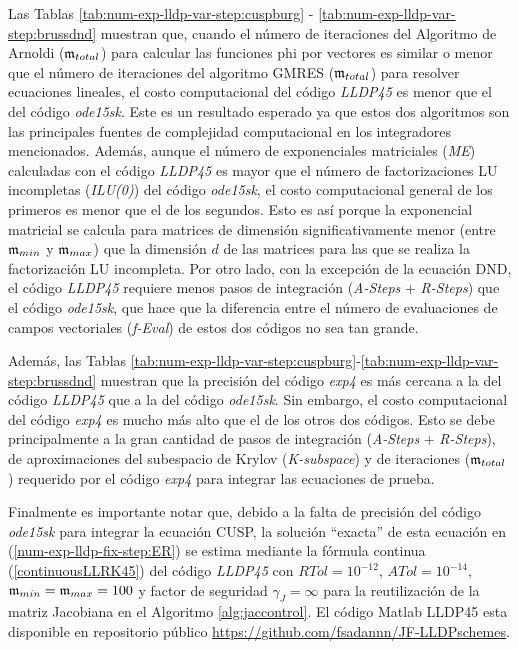 \vspace{0.5cm}

Las Tablas \ref{tab:num-exp-lldp-var-step:cuspburg} - \ref{tab:num-exp-lldp-var-step:brussdnd} muestran que, cuando el número de iteraciones del Algoritmo de Arnoldi ($\mathfrak{m}_{total}$) para calcular las funciones phi por vectores es similar o menor que el número de iteraciones del algoritmo GMRES ($\mathfrak{m}_{total}$) para resolver ecuaciones lineales, el costo computacional del código \emph{LLDP45} es menor que el del código \emph{ode15sk}. Este es un resultado esperado ya que estos dos algoritmos son las principales fuentes de complejidad computacional en los integradores mencionados. Además, aunque el número de exponenciales matriciales (\textit{ME}) calculadas con el código \emph{LLDP45} es mayor que el número de factorizaciones LU incompletas (\textit{ILU(0)}) del código \emph{ode15sk}, el costo computacional general de los primeros es menor que el de los segundos. Esto es así porque la exponencial matricial se calcula para matrices de dimensión significativamente menor (entre $\mathfrak{m}_{min}$ y $\mathfrak{m}_{max}$) que la dimensión $d$ de las matrices para las que se realiza la factorización LU incompleta. Por otro lado, con la excepción de la ecuación DND, el código \emph{LLDP45} requiere menos pasos de integración (\textit{A-Steps} + \textit{R-Steps}) que el código \emph{ode15sk}, que hace que la diferencia entre el número de evaluaciones de campos vectoriales (\textit{f-Eval}) de estos dos códigos no sea tan grande.

Además, las Tablas \ref{tab:num-exp-lldp-var-step:cuspburg}-\ref{tab:num-exp-lldp-var-step:brussdnd} muestran que la precisión del código \emph{exp4} es más cercana a la del código \emph{LLDP45} que a la del código \emph{ode15sk}. Sin embargo, el costo computacional del código \emph{exp4} es mucho más alto que el de los otros dos códigos. Esto se debe principalmente a la gran cantidad de pasos de integración (\textit{A-Steps} + \textit{R-Steps}), de aproximaciones del subespacio de Krylov (\textit{K-subspace}) y de iteraciones ($\mathfrak{m}_ {total}$) requerido por el código \emph{exp4} para integrar las ecuaciones de prueba.

Finalmente es importante notar que, debido a la falta de precisión del código \emph{ode15sk} para integrar la ecuación CUSP, la solución ``exacta'' de esta ecuación en (\ref{num-exp-lldp-fix-step:ER}) se estima mediante la fórmula continua (\ref{continuousLLRK45}) del código \emph{LLDP45} con $RTol = 10^{-12}$, $ATol = 10^{-14}$, $\mathfrak{m}_{min} = \mathfrak{m}_{max} = 100$ y factor de seguridad $\gamma_J=\infty$ para la reutilización de la matriz Jacobiana en el Algoritmo \ref{alg:jaccontrol}. El código Matlab LLDP45 esta disponible en repositorio público \url{https://github.com/fsadannn/JF-LLDPschemes}.

